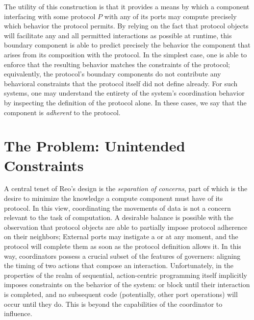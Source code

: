 The utility of this construction is that it provides a means by which a component interfacing with some protocol $P$ with any of its ports may compute precisely which behavior the protocol permits. By relying on the fact that protocol objects will facilitate any and all permitted interactions as possible at runtime, this boundary component is able to predict precisely the behavior the component that arises from its composition with the protocol. In the simplest case, one is able to enforce that the resulting behavior matches the constraints of the protocol; equivalently, the protocol's boundary components do not contribute any behavioral constraints that the protocol itself did not define already. For such systems, one may understand the entirety of the system's coordination behavior by inspecting the definition of the protocol alone. In these cases, we say that the component is \textit{adherent} to the protocol.

\section{The Problem: Unintended Constraints}
\label{sec:unintended_constraints}
A central tenet of Reo's design is the \textit{separation of concerns}, part of which is the desire to minimize the knowledge a compute component must have of its protocol. In this view, coordinating the movements of data is not a concern relevant to the task of computation. A desirable balance is possible with the observation that protocol objects are able to partially impose protocol adherence on their neighbors; External ports may instigate a  or  at any moment, and the protocol will complete them as soon as the protocol definition allows it. In this way, coordinators possess a crucial subset of the features of governers: aligning the timing of two actions that compose an interaction. Unfortunately, in the properties of the realm of sequential, action-centric programming itself implicitly imposes constraints on the behavior of the system:  or  block until their interaction is completed, and no subsequent code (potentially, other port operations) will occur until they do. This is beyond the capabilities of the coordinator to influence.

